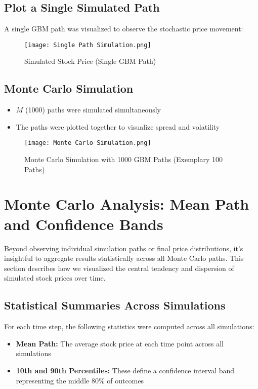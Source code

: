 \documentclass[12pt]{article}
\begin{document}
\subsection{Plot a Single Simulated Path}
A single GBM path was visualized to observe the stochastic price movement:

\begin{figure}[H]
    \centering
    \texttt{[image: Single Path Simulation.png]}
    \caption{Simulated Stock Price (Single GBM Path)}
\end{figure}

\subsection{Monte Carlo Simulation}
\begin{itemize}
    \item \( M \) (1000) paths were simulated simultaneously
    \item The paths were plotted together to visualize spread and volatility
\end{itemize}

\begin{figure}[H]
    \centering
    \texttt{[image: Monte Carlo Simulation.png]}
    \caption{Monte Carlo Simulation with 1000 GBM Paths (Exemplary 100 Paths)}
\end{figure}


\section{Monte Carlo Analysis: Mean Path and Confidence Bands}

Beyond observing individual simulation paths or final price distributions, it's insightful to aggregate results statistically across all Monte Carlo paths. This section describes how we visualized the central tendency and dispersion of simulated stock prices over time.

\subsection*{Statistical Summaries Across Simulations}
For each time step, the following statistics were computed across all simulations:
\begin{itemize}
    \item \textbf{Mean Path:} The average stock price at each time point across all simulations
    \item \textbf{10th and 90th Percentiles:} These define a confidence interval band representing the middle 80\% of outcomes
\end{itemize}
\end{document}
